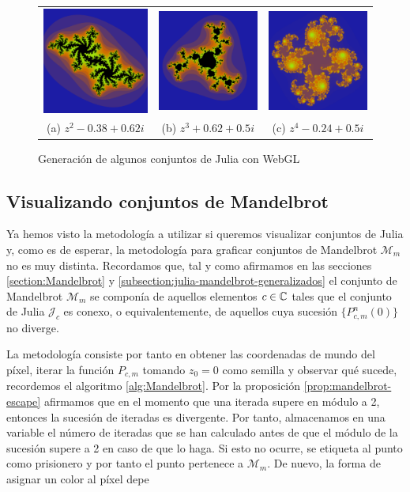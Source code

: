 \begin{figure}[ht]
    \centering
    \begin{tabular}{ccc}
      \includegraphics[scale=0.2]{img/C6/julia-1.png} &   \includegraphics[scale=0.2]{img/C6/julia-2.png} &   \includegraphics[scale=0.2]{img/C6/julia-3.png} \\
    (a) $z^2-0.38+0.62i$ & (b) $z^3+0.62+0.5i$ & (c) $z^4-0.24+0.5i$ \\[6pt]
    \end{tabular}
    \caption{Generación de algunos conjuntos de Julia con WebGL}
    \label{fig:julia-webgl}
\end{figure}

\subsection{Visualizando conjuntos de Mandelbrot}

Ya hemos visto la metodología a utilizar si queremos visualizar conjuntos de Julia y, como es de esperar, la metodología para graficar conjuntos de Mandelbrot $\mathcal{M}_m$ no es muy distinta. Recordamos que, tal y como afirmamos en las secciones \ref{section:Mandelbrot} y \ref{subsection:julia-mandelbrot-generalizados} el conjunto de Mandelbrot $\mathcal{M}_m$ se componía de aquellos elementos $c\in\mathbb{C}$ tales que el conjunto de Julia $\mathcal{J}_c$ es conexo, o equivalentemente, de aquellos cuya sucesión $\{P_{c,m}^n(0)\}$ no diverge.

La metodología consiste por tanto en obtener las coordenadas de mundo del píxel, iterar la función $P_{c,m}$ tomando $z_0=0$ como semilla y observar qué sucede, recordemos el algoritmo \ref{alg:Mandelbrot}. Por la proposición \ref{prop:mandelbrot-escape} afirmamos que en el momento que una iterada supere en módulo a 2, entonces la sucesión de iteradas es divergente. Por tanto, almacenamos en una variable el número de iteradas que se han calculado antes de que el módulo de la sucesión supere a 2 en caso de que lo haga. Si esto no ocurre, se etiqueta al punto como prisionero y por tanto el punto pertenece a $\mathcal{M}_m$. De nuevo, la forma de asignar un color al píxel depe